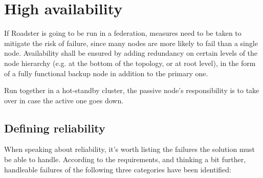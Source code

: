 \section{High availability}\label{sec:approach:ha}
If Roadster is going to be run in a federation, measures need to be taken to
mitigate the risk of failure, since many nodes are more likely to fail than a
single node. Availability shall be ensured by
adding redundancy on certain levels of the node hierarchy (e.g. at the bottom
of the topology, or at root level), in the form of a
fully functional backup node in addition to the primary one.

Run together in a hot-standby cluster, the passive node's responsibility is to
take over in case the active one goes down.

\subsection{Defining reliability}
When speaking about reliability, it's worth listing the failures the solution must be
able to handle. According to the requirements, and thinking a bit further,
handleable failures of the following three categories have been identified:


